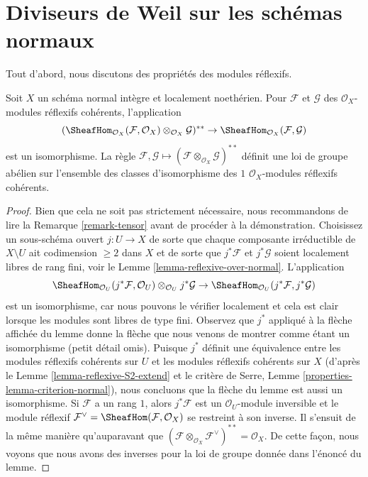 \section{Diviseurs de Weil sur les schémas normaux}
\label{section-weil-divisors-normal}

\noindent
Tout d'abord, nous discutons des propriétés des modules réflexifs.

\begin{lemma}
\label{lemma-reflexive-normal}
Soit  $X$  un schéma normal intègre et localement noethérien. Pour
 $\mathcal{F}$  et  $\mathcal{G}$  des  $\mathcal{O}_X$-modules réflexifs cohérents,
l'application
$$
(\SheafHom_{\mathcal{O}_X}(\mathcal{F}, \mathcal{O}_X)
\otimes_{\mathcal{O}_X} \mathcal{G})^{**} \to
\SheafHom_{\mathcal{O}_X}(\mathcal{F}, \mathcal{G})
$$
est un isomorphisme. La règle  $\mathcal{F}, \mathcal{G} \mapsto
(\mathcal{F} \otimes_{\mathcal{O}_X} \mathcal{G})^{**}$  définit une loi de groupe abélien sur
l'ensemble des classes d'isomorphisme des  $1$   $\mathcal{O}_X$-modules
réflexifs cohérents.
\end{lemma}

\begin{proof}
Bien que cela ne soit pas strictement nécessaire, nous recommandons de lire la
Remarque  \ref{remark-tensor}  avant de procéder à la démonstration. Choisissez un
sous-schéma ouvert  $j : U \to X$  de sorte que chaque composante irréductible de
 $X \setminus U$  ait codimension  $\geq 2$  dans  $X$  et de sorte que
 $j^*\mathcal{F}$  et  $j^*\mathcal{G}$  soient localement libres de rang fini, voir le Lemme
 \ref{lemma-reflexive-over-normal}. L'application
$$
\SheafHom_{\mathcal{O}_U}(j^*\mathcal{F}, \mathcal{O}_U)
\otimes_{\mathcal{O}_U} j^*\mathcal{G} \to
\SheafHom_{\mathcal{O}_U}(j^*\mathcal{F}, j^*\mathcal{G})
$$
est un isomorphisme, car nous pouvons le vérifier localement et cela est clair
lorsque les modules sont libres de type fini. Observez que  $j^*$  appliqué à
la flèche affichée du lemme donne la flèche que nous venons de montrer comme étant
un isomorphisme (petit détail omis). Puisque  $j^*$  définit une équivalence
entre les modules réflexifs cohérents sur  $U$  et les modules réflexifs
cohérents sur  $X$  (d'après le Lemme  \ref{lemma-reflexive-S2-extend}  et le critère de Serre,
Lemme  \ref{properties-lemma-criterion-normal}), nous concluons que la flèche du lemme est aussi un
isomorphisme. Si  $\mathcal{F}$  a un rang  $1$, alors  $j^*\mathcal{F}$  est un
 $\mathcal{O}_U$-module inversible et le module réflexif  $\mathcal{F}^\vee = \SheafHom(\mathcal{F}, \mathcal{O}_X)$  se restreint à
son inverse. Il s'ensuit de la même manière qu'auparavant que  $(\mathcal{F} \otimes_{\mathcal{O}_X} \mathcal{F}^\vee)^{**} = \mathcal{O}_X$. De
cette façon, nous voyons que nous avons des inverses pour la loi de groupe donnée
dans l'énoncé du lemme.
\end{proof}

